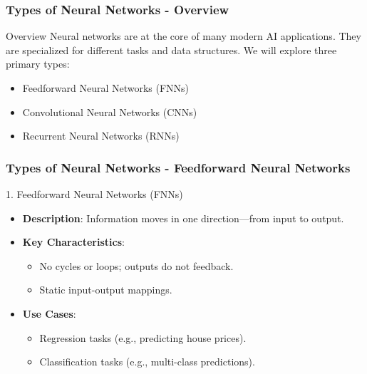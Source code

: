 \documentclass[aspectratio=169]{beamer}
\begin{document}
\begin{frame}[fragile]
    \frametitle{Types of Neural Networks - Overview}
    \begin{block}{Overview}
        Neural networks are at the core of many modern AI applications. They are specialized for different tasks and data structures. 
        We will explore three primary types:
        \begin{itemize}
            \item Feedforward Neural Networks (FNNs)
            \item Convolutional Neural Networks (CNNs)
            \item Recurrent Neural Networks (RNNs)
        \end{itemize}
    \end{block}
\end{frame}

\begin{frame}[fragile]
    \frametitle{Types of Neural Networks - Feedforward Neural Networks}
    \begin{block}{1. Feedforward Neural Networks (FNNs)}
        \begin{itemize}
            \item \textbf{Description}: Information moves in one direction—from input to output.
            \item \textbf{Key Characteristics}:
                \begin{itemize}
                    \item No cycles or loops; outputs do not feedback.
                    \item Static input-output mappings.
                \end{itemize}
            \item \textbf{Use Cases}:
                \begin{itemize}
                    \item Regression tasks (e.g., predicting house prices).
                    \item Classification tasks (e.g., multi-class predictions).
                \end{itemize}
        \end{itemize}
    \end{block}
\end{frame}
\end{document}
